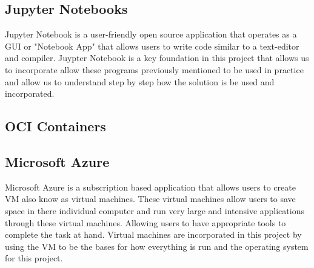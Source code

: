 \documentclass[conference,twoside]{IEEEtran}
\begin{document}
\subsection{Jupyter Notebooks}
	Jupyter Notebook is a user-friendly open source application that operates as a GUI or "Notebook App" that allows users to write code similar to a text-editor and compiler. Juypter Notebook is a key foundation in this project that allows us to incorporate allow these programs previously mentioned to be used in practice and allow us to understand step by step how the solution is be used and incorporated.


\subsection{OCI Containers}


\subsection{Microsoft Azure}
	Microsoft Azure is a subscription based application that allows users to create VM also know as virtual machines. These virtual machines allow users to save space in there individual computer and run very large and intensive applications through these virtual machines. Allowing users to have appropriate tools to complete the task at hand. Virtual machines are incorporated in this project by using the VM to be the bases for how everything is run and the operating system for this project.
\end{document}
